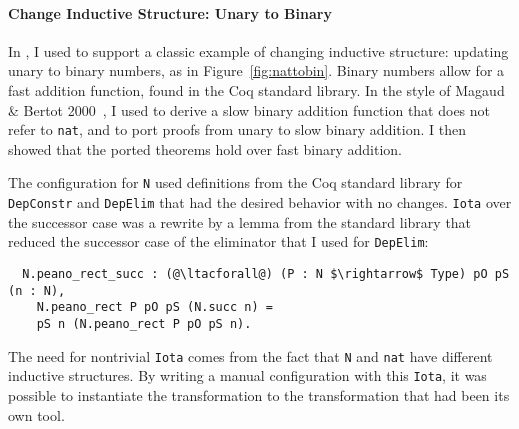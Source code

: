 \paragraph{Change Inductive Structure: Unary to Binary}
In \href{https://github.com/uwplse/pumpkin-pi/blob/v2.0.0/plugin/coq/nonorn.v}{}, I used \toolnamec to support a classic example of changing inductive structure:
updating unary to binary numbers,
as in Figure~\ref{fig:nattobin}.
Binary numbers allow for a fast addition function, found in the Coq standard library.
In the style of Magaud \& Bertot 2000~\cite{magaud2000changing}, I used \toolnamec to derive a slow binary
addition function that does not refer to \lstinline{nat},
and to port proofs from unary to slow binary addition.
I then showed that the ported theorems hold over fast binary addition.

The configuration for \lstinline{N} used definitions from the Coq standard library
for \lstinline{DepConstr} and \lstinline{DepElim} that had the desired behavior with no changes.
\lstinline{Iota} over the successor case was a rewrite by a lemma
from the standard library that reduced the successor case of the eliminator that I used for \lstinline{DepElim}:

\begin{lstlisting}
  N.peano_rect_succ : (@\ltacforall@) (P : N $\rightarrow$ Type) pO pS (n : N),
    N.peano_rect P pO pS (N.succ n) =
    pS n (N.peano_rect P pO pS n).
\end{lstlisting}
%
The need for nontrivial \lstinline{Iota} comes from the fact that \lstinline{N} and \lstinline{nat}
have different inductive structures.
By writing a manual configuration with this \lstinline{Iota}, it was possible to instantiate the \toolnamec transformation
to the transformation that had been its own tool.


